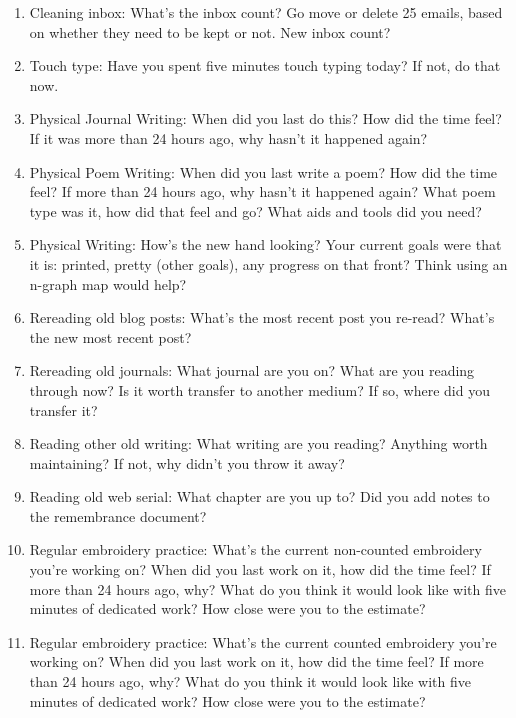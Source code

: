 \begin{enumerate}
\item Cleaning inbox: What's the inbox count? Go move or delete 25 emails, based on whether they need to be kept or not. New inbox count?

\item Touch type: Have you spent five minutes touch typing today? If not, do that now.

\item Physical Journal Writing: When did you last do this? How did the time feel? If it was more than 24 hours ago, why hasn't it happened again?

\item Physical Poem Writing: When did you last write a poem? How did the time feel? If more than 24 hours ago, why hasn't it happened again? What poem type was it, how did that feel and go? What aids and tools did you need?

\item Physical Writing: How's the new hand looking? Your current goals were that it is: printed, pretty (other goals), any progress on that front? Think using an n-graph map would help?

\item Rereading old blog posts: What's the most recent post you re-read? What's the new most recent post?

\item Rereading old journals: What journal are you on? What are you reading through now? Is it worth transfer to another medium? If so, where did you transfer it?

\item Reading other old writing: What writing are you reading? Anything worth maintaining? If not, why didn't you throw it away?

\item Reading old web serial: What chapter are you up to? Did you add notes to the remembrance document?

\item Regular embroidery practice: What's the current non-counted embroidery you're working on? When did you last work on it, how did the time feel? If more than 24 hours ago, why? What do you think it would look like with five minutes of dedicated work? How close were you to the estimate?

\item Regular embroidery practice: What's the current counted embroidery you're working on? When did you last work on it, how did the time feel? If more than 24 hours ago, why? What do you think it would look like with five minutes of dedicated work? How close were you to the estimate?


\end{enumerate}

